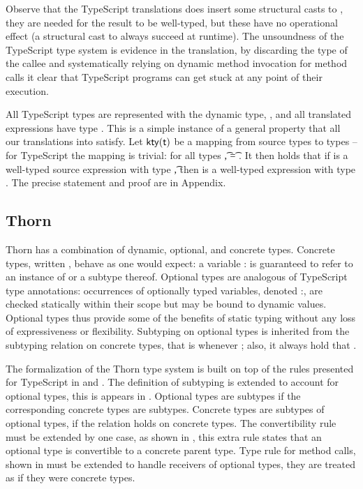 \documentclass[acmlarge, anonymous, authordraft, review]{acmart} %
\begin{document}
\noindent
Observe that the TypeScript translations does insert some structural casts
to \any, they are needed for the result to be well-typed, but these have no
operational effect (a structural cast to \any always succeed at runtime).
The unsoundness of the TypeScript type system is evidence in the
translation, by discarding the type of the callee and systematically relying
on dynamic method invocation for method calls it clear that TypeScript
programs can get stuck at any point of their execution.


All TypeScript types are represented with the dynamic \kafka type, \any, and
all translated expressions have type \any.  This is a simple instance of a
general property that all our translations into \kafka satisfy.  Let
\(\kty\t\) be a mapping from source types to \kafka types -- for TypeScript
the mapping is trivial: for all types \t, \kty\t = \src{\any}.  It then
holds that if \e is a well-typed source expression with type \t, then
\TR{\e} is a well-typed \kafka expression with type \kty{\t}.  The precise
statement and proof are in Appendix.


\subsection{Thorn}

Thorn has a combination of dynamic, optional, and concrete types.  Concrete
types, written \C, behave as one would expect: a variable {\x:\C} is
guaranteed to refer to an instance of \C or a subtype thereof.  Optional
types are analogous of TypeScript type annotations: occurrences of
optionally typed variables, denoted {\x:\dt\C}, are checked statically
within their scope but may be bound to dynamic values.  Optional types thus
provide some of the benefits of static typing without any loss of
expressiveness or flexibility.  Subtyping on optional types is inherited
from the subtyping relation on concrete types, that is {\dt\C} \Sub {\dt\D}
whenever \C \Sub \D; also, it always hold that \C \Sub \dt\C.

The formalization of the Thorn type system is built on top of the rules
presented for TypeScript in  and . The
definition of subtyping is extended to account for optional types, this is
appears in . Optional types are subtypes if the corresponding
concrete types are subtypes. Concrete types are subtypes of optional types,
if the relation holds on concrete types. The convertibility rule must be
extended by one case, as shown in , this extra rule states
that an optional type is convertible to a concrete parent type. Type rule
for method calls, shown in  must be extended to handle
receivers of optional types, they are treated as if they were concrete
types.
\end{document}
